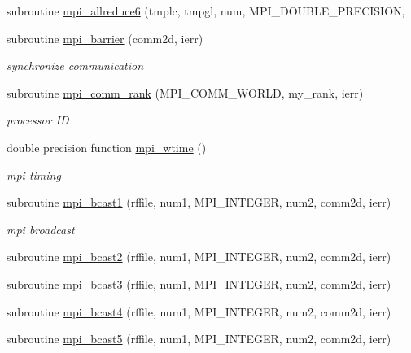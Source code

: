 \begin{DoxyCompactItemize}
\item 
subroutine \mbox{\hyperlink{namespacempistub_a3a34d1b95074e43d0c79295326059ef2}{mpi\+\_\+allreduce6}} (tmplc, tmpgl, num, M\+P\+I\+\_\+\+D\+O\+U\+B\+L\+E\+\_\+\+P\+R\+E\+C\+I\+S\+I\+ON,
\item 
subroutine \mbox{\hyperlink{namespacempistub_a0d84064615f696d4877ad9f912d4cbef}{mpi\+\_\+barrier}} (comm2d, ierr)
\begin{DoxyCompactList}\small\item\em synchronize communication \end{DoxyCompactList}\item 
subroutine \mbox{\hyperlink{namespacempistub_a3085e38e0e5d38df633afc7b2d92cebb}{mpi\+\_\+comm\+\_\+rank}} (M\+P\+I\+\_\+\+C\+O\+M\+M\+\_\+\+W\+O\+R\+LD, my\+\_\+rank, ierr)
\begin{DoxyCompactList}\small\item\em processor ID \end{DoxyCompactList}\item 
double precision function \mbox{\hyperlink{namespacempistub_a2456432a60801629e19273ebe4114bc9}{mpi\+\_\+wtime}} ()
\begin{DoxyCompactList}\small\item\em mpi timing \end{DoxyCompactList}\item 
subroutine \mbox{\hyperlink{namespacempistub_a28c2930a0c38a6318865ef760b6e87c0}{mpi\+\_\+bcast1}} (rffile, num1, M\+P\+I\+\_\+\+I\+N\+T\+E\+G\+ER, num2, comm2d, ierr)
\begin{DoxyCompactList}\small\item\em mpi broadcast \end{DoxyCompactList}\item 
subroutine \mbox{\hyperlink{namespacempistub_a0d3b09e89256fef8bc0a4f71f7ff73c0}{mpi\+\_\+bcast2}} (rffile, num1, M\+P\+I\+\_\+\+I\+N\+T\+E\+G\+ER, num2, comm2d, ierr)
\item 
subroutine \mbox{\hyperlink{namespacempistub_ae8d4cdea848159c537f06677e1d7b712}{mpi\+\_\+bcast3}} (rffile, num1, M\+P\+I\+\_\+\+I\+N\+T\+E\+G\+ER, num2, comm2d, ierr)
\item 
subroutine \mbox{\hyperlink{namespacempistub_abe276f0cf456de80ee888e6b335a4b7d}{mpi\+\_\+bcast4}} (rffile, num1, M\+P\+I\+\_\+\+I\+N\+T\+E\+G\+ER, num2, comm2d, ierr)
\item 
subroutine \mbox{\hyperlink{namespacempistub_a79437cd731fca94bcf720d8abd6cec77}{mpi\+\_\+bcast5}} (rffile, num1, M\+P\+I\+\_\+\+I\+N\+T\+E\+G\+ER, num2, comm2d, ierr)

\end{DoxyCompactItemize}

